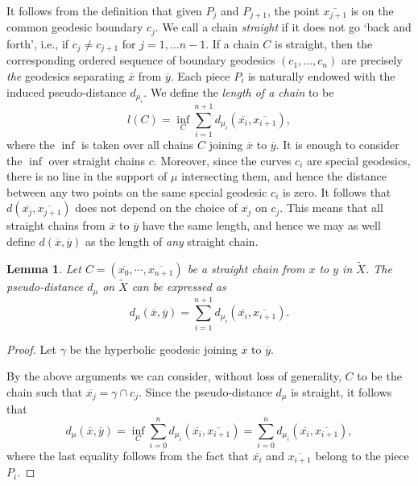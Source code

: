 \documentclass[12pt,article]{amsart}
\numberwithin{equation}{section}
\numberwithin{figure}{section}
\newtheorem{lemma}[equation]{Lemma}
\theoremstyle{definition}
\theoremstyle{plain}
\newcommand*{\wt}[1]{\widetilde{#1}}
\begin{document}
It follows from the definition that given $P_j$ and $P_{j+1}$, the point $\overline{x_{j+1}}$ is on the common geodesic boundary $c_j$. We call a chain \emph{straight} if it does not go `back and forth', i.e., if $c_j \neq c_{j+1}$ for $j = 1, \dots {n-1}$. If a chain $C$ is straight, then the corresponding ordered sequence of boundary geodesics $(c_1, \dots , c_n)$ are precisely \emph{the} geodesics separating $\overline{x}$ from $\overline{y}$. 
Each piece $P_i$ is naturally endowed with the induced pseudo-distance $d_{\mu_i}$. We define the \emph{length of a chain} to be
\[
l(C)= \inf_{C}\sum_{i=1}^{n+1} d_{\mu_i} (\overline{x_i} , \overline{x_{i+1}}),
\]
where the $\inf$ is taken over all chains $C$ joining $\overline{x}$ to $\overline{y}$.
It is enough to consider the $\inf$ over straight chains $c$. Moreover, since the curves $c_i$ are special geodesics, there is no line in the support of $\mu$ intersecting them, and hence the distance between any two points on the same special geodesic $c_i$ is zero. It follows that $d(\overline{x_j}, \overline{x_{j+1}})$ does not depend on the choice of $\overline{x_j}$ on $c_j$. This means that all straight chains from $\overline{x}$ to $\overline{y}$ have the same length, and hence we may as well define $d(\overline{x},\overline{y})$ as the length of \emph{any} straight chain.

\begin{lemma}
Let $C = (\overline{x_0}, \cdots, \overline{x_{n+1}})$ be a straight chain from $x$ to $y$ in $\wt{X}$. The pseudo-distance $d_\mu$ on $\wt{X}$ can be expressed as
\[
d_\mu (\overline{x},\overline{y}) = \sum_{i=1}^{n+1} d_{\mu_i} (\overline{x_i} , \overline{x_{i+1}}).
\]
\label{lem:gradeddistance}
\end{lemma}
\begin{proof}
Let $\gamma$ be the hyperbolic geodesic joining $\overline{x}$ to $\overline{y}$.

By the above arguments we can consider, without loss of generality, $C$ to be the chain such that $\overline{x_j} = \gamma \cap c_j$. Since the pseudo-distance $d_\mu$ is straight, it follows that
\[
d_\mu (\overline{x},\overline{y}) = \inf_{C}\sum_{i =0}^{n} d_{\mu_i} (\overline{x_i} , \overline{x_{i+1}}) = \sum_{i =0}^{n} d_{\mu_i} (\overline{x_i} , \overline{x_{i+1}}),
\]
where the last equality follows from the fact that $\overline{x_i}$ and $\overline{x_{i+1}}$ belong to the piece $P_i$.
\end{proof}
\end{document}
